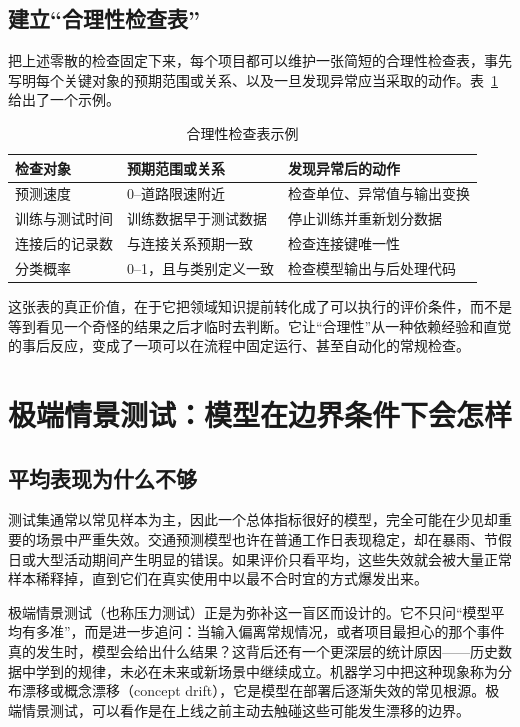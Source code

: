 \subsection{建立“合理性检查表”}

把上述零散的检查固定下来，每个项目都可以维护一张简短的合理性检查表，事先写明每个关键对象的预期范围或关系、以及一旦发现异常应当采取的动作。表~\ref{tab:sanity_check} 给出了一个示例。

\begin{table}[htbp]
\centering
\caption{合理性检查表示例}
\label{tab:sanity_check}
\small
\begin{tabular}{p{}p{}p{}}
\toprule
检查对象 & 预期范围或关系 & 发现异常后的动作 \\
\midrule
预测速度 & 0--道路限速附近 & 检查单位、异常值与输出变换 \\
训练与测试时间 & 训练数据早于测试数据 & 停止训练并重新划分数据 \\
连接后的记录数 & 与连接关系预期一致 & 检查连接键唯一性 \\
分类概率 & 0--1，且与类别定义一致 & 检查模型输出与后处理代码 \\
\bottomrule
\end{tabular}
\end{table}

这张表的真正价值，在于它把领域知识提前转化成了可以执行的评价条件，而不是等到看见一个奇怪的结果之后才临时去判断。它让“合理性”从一种依赖经验和直觉的事后反应，变成了一项可以在流程中固定运行、甚至自动化的常规检查。

\section{极端情景测试：模型在边界条件下会怎样}

\subsection{平均表现为什么不够}

测试集通常以常见样本为主，因此一个总体指标很好的模型，完全可能在少见却重要的场景中严重失效。交通预测模型也许在普通工作日表现稳定，却在暴雨、节假日或大型活动期间产生明显的错误。如果评价只看平均，这些失效就会被大量正常样本稀释掉，直到它们在真实使用中以最不合时宜的方式爆发出来。

极端情景测试（也称压力测试）正是为弥补这一盲区而设计的。它不只问“模型平均有多准”，而是进一步追问：当输入偏离常规情况，或者项目最担心的那个事件真的发生时，模型会给出什么结果？这背后还有一个更深层的统计原因——历史数据中学到的规律，未必在未来或新场景中继续成立。机器学习中把这种现象称为分布漂移或概念漂移（concept drift），它是模型在部署后逐渐失效的常见根源\cite{gama2014survey}。极端情景测试，可以看作是在上线之前主动去触碰这些可能发生漂移的边界。

